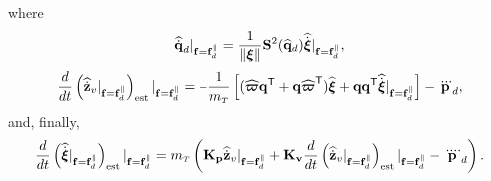 \documentclass[journal,onecolumn]{IEEEtran}
\newcommand{\minus}{\scalebox{0.75}[1.0]{$-$}}
\begin{document}
    where
	\begin{equation}
		\qddothat|_{\f=\f_d^{\|}} = \frac{1}{\|\Xiq\|}\Skew[2]{\qdhat}\widehat{\dot{\Xiq}}|_{\f=\f_d^{\|}},
		\label{eq:qd_dot_fd}
	\end{equation}
	\begin{equation}
		\frac{d}{dt}\LP\zvdothatdot|_{\f=\fd^{\|}}\RP_{\text{est}}|_{\f=\fd^{\|}} =  \minus\frac{1}{\mT}\LSB(\widehat{\bs{\varpi}}\dir[T] + \dir\widehat{\bs{\varpi}}\trs)\widehat{\Xiq} + \dir\dir[T]\widehat{\dot{\Xiq}}|_{\f=\fd^{\|}}\RSB - \pLdtdot,
	\end{equation}
	and, finally,
	\begin{equation}
		\frac{d}{dt}\LP\widehat{\dot{\Xiq}}|_{\f=\fd^{\|}}\RP_{\text{est}}|_{\f=\fd^{\|}} = \mT\left( {\bf K_p} \zvdothat|_{\f=\fd^{\|}}
		+  {\bf K_v} \frac{d}{dt}\LP\zvdothatdot|_{\f=\fd^{\|}}\RP_{\text{est}}|_{\f=\f_d^{\|}}
		- \pLdqdot\right).
	\end{equation}
	
\end{document}
